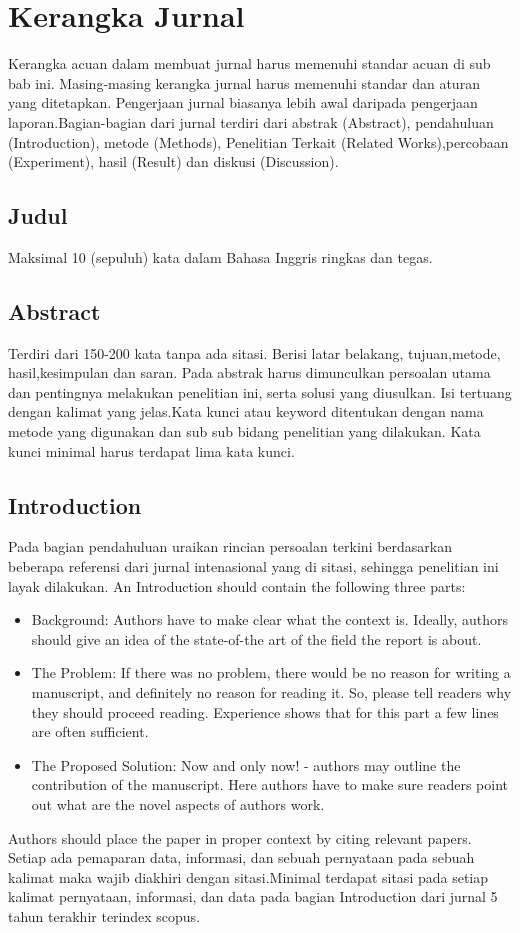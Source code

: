 \section{Kerangka Jurnal}
Kerangka acuan dalam membuat jurnal harus memenuhi standar acuan di sub bab ini. Masing-masing kerangka jurnal harus memenuhi standar dan aturan yang ditetapkan. Pengerjaan jurnal biasanya lebih awal daripada pengerjaan laporan.Bagian-bagian dari jurnal terdiri dari abstrak (Abstract), pendahuluan (Introduction), metode (Methods), Penelitian Terkait (Related Works),percobaan (Experiment), hasil (Result) dan diskusi (Discussion).

\subsection{Judul}
Maksimal 10 (sepuluh) kata dalam Bahasa Inggris ringkas dan tegas.

\subsection{Abstract}
Terdiri dari 150-200 kata tanpa ada sitasi. Berisi latar belakang, tujuan,metode, hasil,kesimpulan dan saran. Pada abstrak harus dimunculkan persoalan utama dan pentingnya melakukan penelitian ini, serta solusi yang diusulkan. Isi tertuang dengan kalimat yang jelas.Kata kunci atau keyword ditentukan dengan nama metode yang digunakan dan sub sub bidang penelitian yang dilakukan. Kata kunci minimal harus terdapat lima kata kunci.

\subsection{Introduction}
Pada bagian pendahuluan uraikan rincian persoalan terkini berdasarkan beberapa referensi dari jurnal intenasional yang di sitasi, sehingga penelitian ini layak dilakukan. An Introduction should contain the following three parts:
\begin{itemize}
    \item Background: Authors have to make clear what the context is. Ideally, authors should give an idea of the state-of-the art of the field the report is about.
    \item  The Problem: If there was no problem, there would be no reason for writing a manuscript, and definitely no reason for reading it. So, please tell readers why they should proceed reading. Experience shows that for this part a few lines are often sufficient.
    \item The Proposed Solution: Now and only now! - authors may outline the contribution of the manuscript. Here authors have to make sure readers point out what are the novel aspects of authors work.
\end{itemize}
Authors should place the paper in proper context by citing relevant papers. Setiap ada pemaparan data, informasi, dan sebuah pernyataan pada sebuah kalimat maka wajib diakhiri dengan sitasi.Minimal terdapat sitasi pada setiap kalimat pernyataan, informasi, dan data pada bagian Introduction dari jurnal 5 tahun terakhir terindex scopus.

